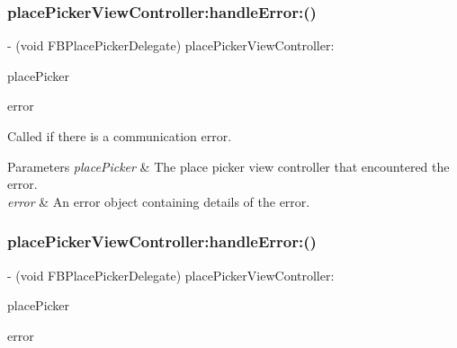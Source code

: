 \subsubsection{\texorpdfstring{place\+Picker\+View\+Controller\+:handle\+Error\+:()}{placePickerViewController:handleError:()}\hspace{0.1cm}{\footnotesize\ttfamily [1/5]}}
{\footnotesize\ttfamily -\/ (void F\+B\+Place\+Picker\+Delegate) place\+Picker\+View\+Controller\+: \begin{DoxyParamCaption}\item[{(\hyperlink{interfaceFBPlacePickerViewController}{F\+B\+Place\+Picker\+View\+Controller} $\ast$)}]{place\+Picker }\item[{handleError:(N\+S\+Error $\ast$)}]{error }\end{DoxyParamCaption}\hspace{0.3cm}{\ttfamily [optional]}}

Called if there is a communication error.


\begin{DoxyParams}{Parameters}
{\em place\+Picker} & The place picker view controller that encountered the error. \\
\hline
{\em error} & An error object containing details of the error. \\
\hline
\end{DoxyParams}
\mbox{\label{protocolFBPlacePickerDelegate_01-p_a5a050442be2188ad3b2b04aa977577a4}} 
\subsubsection{\texorpdfstring{place\+Picker\+View\+Controller\+:handle\+Error\+:()}{placePickerViewController:handleError:()}\hspace{0.1cm}{\footnotesize\ttfamily [2/5]}}
{\footnotesize\ttfamily -\/ (void F\+B\+Place\+Picker\+Delegate) place\+Picker\+View\+Controller\+: \begin{DoxyParamCaption}\item[{(\hyperlink{interfaceFBPlacePickerViewController}{F\+B\+Place\+Picker\+View\+Controller} $\ast$)}]{place\+Picker }\item[{handleError:(N\+S\+Error $\ast$)}]{error }\end{DoxyParamCaption}\hspace{0.3cm}{\ttfamily [optional]}}


